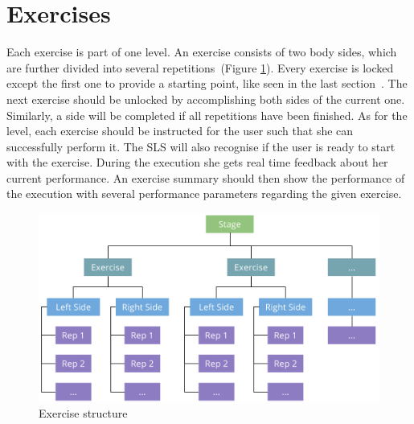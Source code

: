 \section{Exercises}\label{4_4_exercises}
Each exercise is part of one level. An exercise consists of two body sides, which are further divided into several repetitions~(Figure \ref{fig:exerciseStructure}). Every exercise is locked except the first one to provide a starting point, like seen in the last section~. The next exercise should be unlocked by accomplishing both sides of the current one. Similarly, a side will be completed if all repetitions have been finished. As for the level, each exercise should be instructed for the user such that she can successfully perform it. The SLS will also recognise if the user is ready to start with the exercise. During the execution she gets real time feedback about her current performance. An exercise summary should then show the performance of the execution with several performance parameters regarding the given exercise.
\begin{figure}[htb]
	\centering
	\begin{minipage}[t]{1\linewidth}
		\centering
		\includegraphics[width=1\linewidth]{Pictures/exerciseStructureTopDown2}
		\caption{Exercise structure}
		\label{fig:exerciseStructure}
	\end{minipage}
\end{figure}

